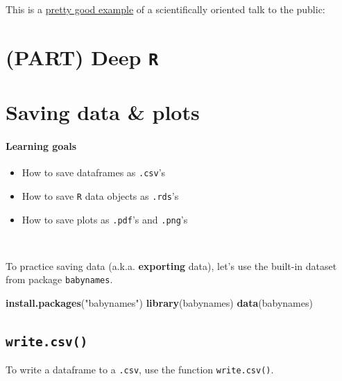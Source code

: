 \documentclass[]{book}
\newenvironment{Shaded}{\begin{snugshade}}{\end{snugshade}}
\newcommand{\KeywordTok}[1]{\textcolor[rgb]{0.13,0.29,0.53}{\textbf{#1}}}
\newcommand{\NormalTok}[1]{#1}
\newcommand{\StringTok}[1]{\textcolor[rgb]{0.31,0.60,0.02}{#1}}
\providecommand{\tightlist}{%
  \setlength{\itemsep}{0pt}\setlength{\parskip}{0pt}}
\begin{document}
This is a \href{https://www.youtube.com/watch?v=mae2eugjUsU}{pretty good example} of a scientifically oriented talk to the public:

\hypertarget{part-deep-r}{%
\chapter*{\texorpdfstring{(PART) Deep \texttt{R}}{(PART) Deep R}}\label{part-deep-r}}

\hypertarget{saving-data-plots}{%
\chapter{Saving data \& plots}\label{saving-data-plots}}

\hypertarget{learning-goals-28}{%
\subsubsection*{Learning goals}\label{learning-goals-28}}

\begin{itemize}
\tightlist
\item
  How to save dataframes as \texttt{.csv}'s
\item
  How to save \texttt{R} data objects as \texttt{.rds}'s
\item
  How to save plots as \texttt{.pdf}'s and \texttt{.png}'s
\end{itemize}

~

To practice saving data (a.k.a. \textbf{exporting} data), let's use the built-in dataset from package \texttt{babynames}.

\begin{Shaded}
\begin{Highlighting}[]
\KeywordTok{install.packages}\NormalTok{(}\StringTok{"babynames"}\NormalTok{)}
\KeywordTok{library}\NormalTok{(babynames)}
\KeywordTok{data}\NormalTok{(babynames)}
\end{Highlighting}
\end{Shaded}

\hypertarget{write.csv}{%
\section*{\texorpdfstring{\texttt{write.csv()}}{write.csv()}}\label{write.csv}}

To write a dataframe to a \texttt{.csv}, use the function \texttt{write.csv()}.
\end{document}
